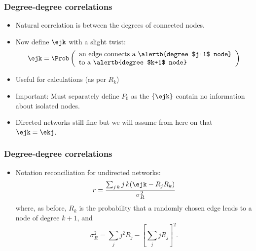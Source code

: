 \begin{frame}
  \frametitle{Degree-degree correlations}
  
  \begin{itemize}
  \item<2->
    Natural correlation is between the degrees
    of connected nodes.
  \item<3->
    Now define $\ejk$ with a slight twist:
    $$
    \ejk
      = \Prob 
      \left(
        \begin{array}{ll}
          \mbox{an edge connects a \alertb{degree $j+1$ node}} \\ 
          \mbox{to a \alertb{degree $k+1$ node}}
        \end{array}
      \right)
    $$
  \item<5->
    Useful for calculations (as per $R_k$)
  \item<6->
    \alert{Important:} Must separately define $P_0$
    as the $\{\ejk\}$ contain no information about
    isolated nodes.
  \item<7->
    Directed networks still fine but we will assume
    from here on that $\ejk = \ekj$.
  \end{itemize}

\end{frame}

\begin{frame}
  \frametitle{Degree-degree correlations}

  \begin{itemize}
  \item<1->
    Notation reconciliation for undirected networks:
    $$
    r = 
    \frac{\sum_{j\, k} j\, k (\ejk - R_j R_k)}
    {\sigma_R^2}
    $$
    where, as before, $R_k$ is the probability that a 
    randomly chosen edge leads to a node of degree $k+1$,
    and
    $$
    \sigma_R^2 = 
    \sum_j j^2 R_j - 
    \left[
      \sum_j j R_j
    \right]^2.
    $$
  \end{itemize}

\end{frame}

